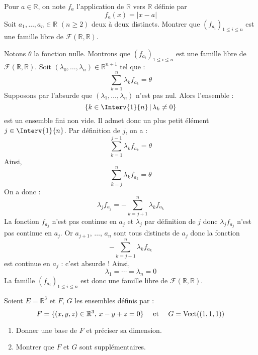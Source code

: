 \documentclass[a4paper,twoside,french,11pt]{VcCours}
\begin{document}
\begin{Exercice}{} Pour $a \in \mathbb{R}$, on note $f_a$ l'application de $\mathbb{R}$ vers $\mathbb{R}$ définie par 
$$f_a(x) = \vert x - a \vert$$
Soit $a_1, \ldots, a_n \in \mathbb{R}$ $(n \geq 2)$ deux à deux distincts. Montrer que $(f_{a_i})_{1 \leq i \leq n}$ est une famille libre de $\mathcal{F}(\mathbb{R}, \mathbb{R})$.
\end{Exercice} 

\corr Notons $\theta$ la fonction nulle. Montrons que $(f_{a_i})_{1 \leq i \leq n}$ est une famille libre de $\mathcal{F}(\mathbb{R}, \mathbb{R})$. Soit $(\lambda_0, \ldots, \lambda_n) \in \mathbb{R}^{n+1}$ tel que :
$$ \sum_{k=1}^n \lambda_k f_{a_k} = \theta$$
Supposons par l'absurde que $(\lambda_1, \ldots, \lambda_n)$ n'est pas nul. Alors l'ensemble :
$$ \lbrace k \in \Interv{1}{n} \, \vert \, \lambda_k \neq 0 \rbrace$$
est un ensemble fini non vide. Il admet donc un plus petit élément $j \in \Interv{1}{n}$. Par définition de $j$, on a :
$$ \sum_{k=1}^{j-1} \lambda_k f_{a_k} = \theta$$
Ainsi,
$$ \sum_{k=j}^n \lambda_k f_{a_k} = \theta$$
On a donc :
$$ \lambda_j f_{a_j} = - \sum_{k=j+1}^n \lambda_k f_{a_k}$$
La fonction $f_{a_j}$ n'est pas continue en $a_j$ et $\lambda_j$ par définition de $j$ donc $\lambda_j f_{a_j}$ n'est pas continue en $a_j$. Or $a_{j+1}$, $\ldots$, $a_n$ sont tous distincts de $a_j$ donc la fonction 
$$ - \sum_{k=j+1}^n \lambda_k f_{a_k}$$
est continue en $a_j$ : c'est absurde ! Ainsi, 
$$ \lambda_1 = \cdots = \lambda_n = 0$$
La famille $(f_{a_i})_{1 \leq i \leq n}$ est donc une famille libre de $\mathcal{F}(\mathbb{R}, \mathbb{R})$.

\begin{Exercice}{} Soient $E= \mathbb{R}^3$ et $F$, $G$ les ensembles définis par :
$$ F = \lbrace (x,y,z) \in \mathbb{R}^3, \, x-y+z=0 \rbrace \quad \hbox{ et }  \quad G = \textrm{Vect}((1,1,1)) $$

\begin{enumerate}
\item Donner une base de $F$ et préciser sa dimension.
\item Montrer que $F$ et $G$ sont supplémentaires.
\end{enumerate}
\end{Exercice}
\end{document}
